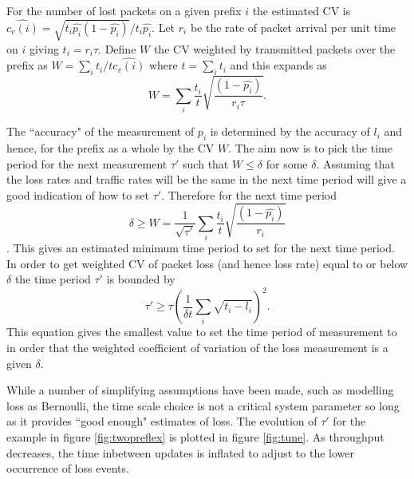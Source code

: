 For the number of lost packets on a given prefix $i$ the estimated CV is $\hat{c_v(i)} = \sqrt{t_i \hat{p_i}(1- \hat{p_i})}/t_i\hat{p_i}$.
Let $r_i$ be the rate of packet arrival per unit time on $i$ giving $t_i= r_i \tau$.  
Define $W$ the CV weighted by transmitted packets over the prefix as $W= \sum_i t_i/t \hat{c_v(i)}$ where $t= \sum_i t_i$ and this expands as $$W =  \sum_i \frac{t_i}{t} \sqrt{\frac{ (1- \hat{p_i})} {r_i \tau }}.$$

The ``accuracy" of the measurement of $p_i$ is determined by the accuracy of $l_i$ and hence, for the prefix as a whole by the CV $W$.
The aim now is to pick the time period for the next measurement $\tau'$ such that $W \leq \delta$ for some $\delta$.  
Assuming that the loss rates and traffic rates will be the same in the next time period will give a good indication of how to set $\tau'$.  
Therefore for the next time period $$\delta \geq W = \frac{1}{\sqrt{\tau'}}\sum_i \frac{t_i}{t} \sqrt{\frac{(1- \hat{p_i})} {r_i }}$$.
This gives an estimated minimum time period to set for the next time period.  In order to get weighted CV of packet loss (and hence loss rate) equal to or below $\delta$ the time period $\tau'$ is bounded by
$$
\tau' \geq \tau \left( \frac{1}{\delta t}\sum_i
\sqrt{t_i- l_i} \right)^2.
$$
This equation gives the smallest value to set the time period of measurement to in order that the weighted coefficient of variation of the loss measurement is a given $\delta$.
    
While a number of simplifying assumptions have been made, such as modelling loss as Bernoulli, the time scale choice is not a critical system parameter so long as it provides ``good enough" estimates of loss. 
The evolution of $\tau'$ for the example in figure \ref{fig:twopreflex} is plotted in figure \ref{fig:tune}. 
As throughput decreases, the time inbetween updates is inflated to adjust to the lower occurrence of loss events. 
